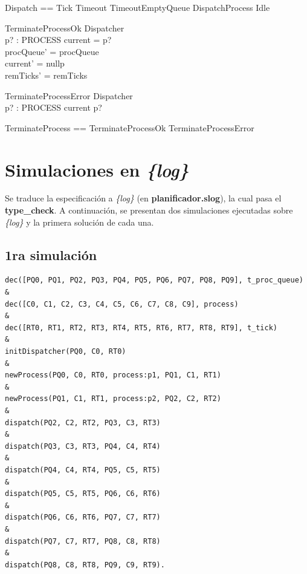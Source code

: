 \documentclass{article}
\begin{document}
\begin{zed}
    Dispatch == Tick \lor Timeout \lor TimeoutEmptyQueue \lor DispatchProcess \lor Idle
\end{zed}

\begin{schema}{TerminateProcessOk}
    \Delta Dispatcher \\
    p? : PROCESS
\where
    current = p? \\
    procQueue' = procQueue \\
    current' = nullp \\
    remTicks' = remTicks
\end{schema}

\begin{schema}{TerminateProcessError}
    \Xi Dispatcher \\
    p? : PROCESS
\where
    current \neq p?
\end{schema}

\begin{zed}
    TerminateProcess == TerminateProcessOk \lor TerminateProcessError
\end{zed}


\section{Simulaciones en \textit{\{log\}}}

Se traduce la especificación a \textit{\{log\}} (en \textbf{planificador.slog}), la cual pasa el \textbf{type\_check}. A continuación, se presentan dos simulaciones ejecutadas sobre \textit{\{log\}} y la primera solución de cada una.


\subsection*{1ra simulación}

\begin{verbatim}
dec([PQ0, PQ1, PQ2, PQ3, PQ4, PQ5, PQ6, PQ7, PQ8, PQ9], t_proc_queue) &
dec([C0, C1, C2, C3, C4, C5, C6, C7, C8, C9], process)                &
dec([RT0, RT1, RT2, RT3, RT4, RT5, RT6, RT7, RT8, RT9], t_tick)       &
initDispatcher(PQ0, C0, RT0)                                          & 
newProcess(PQ0, C0, RT0, process:p1, PQ1, C1, RT1)                    & 
newProcess(PQ1, C1, RT1, process:p2, PQ2, C2, RT2)                    & 
dispatch(PQ2, C2, RT2, PQ3, C3, RT3)                                  & 
dispatch(PQ3, C3, RT3, PQ4, C4, RT4)                                  & 
dispatch(PQ4, C4, RT4, PQ5, C5, RT5)                                  & 
dispatch(PQ5, C5, RT5, PQ6, C6, RT6)                                  & 
dispatch(PQ6, C6, RT6, PQ7, C7, RT7)                                  & 
dispatch(PQ7, C7, RT7, PQ8, C8, RT8)                                  & 
dispatch(PQ8, C8, RT8, PQ9, C9, RT9).
\end{verbatim}
\end{document}
